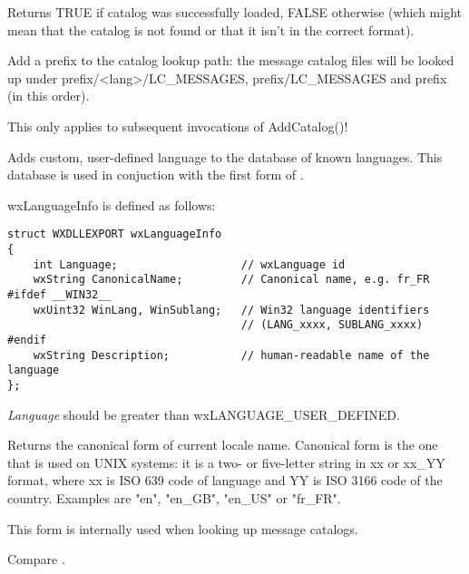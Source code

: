 Returns TRUE if catalog was successfully loaded, FALSE otherwise (which might
mean that the catalog is not found or that it isn't in the correct format).

\label{wxlocaleaddcataloglookuppathprefix}


Add a prefix to the catalog lookup path: the message catalog files will be
looked up under prefix/<lang>/LC\_MESSAGES, prefix/LC\_MESSAGES and prefix
(in this order).

This only applies to subsequent invocations of AddCatalog()!

\label{wxlocaleaddlanguage}


Adds custom, user-defined language to the database of known languages. This
database is used in conjuction with the first form of 
. 

wxLanguageInfo is defined as follows:

\begin{verbatim}
struct WXDLLEXPORT wxLanguageInfo
{
    int Language;                   // wxLanguage id
    wxString CanonicalName;         // Canonical name, e.g. fr_FR
#ifdef __WIN32__
    wxUint32 WinLang, WinSublang;   // Win32 language identifiers
                                    // (LANG_xxxx, SUBLANG_xxxx)
#endif
    wxString Description;           // human-readable name of the language
};
\end{verbatim}


{\it Language} should be greater than wxLANGUAGE\_USER\_DEFINED.



\label{wxlocalegetcanonicalname}


Returns the canonical form of current locale name. Canonical form is the
one that is used on UNIX systems: it is a two- or five-letter string in xx or
xx\_YY format, where xx is ISO 639 code of language and YY is ISO 3166 code of
the country. Examples are "en", "en\_GB", "en\_US" or "fr\_FR".

This form is internally used when looking up message catalogs.

Compare .



